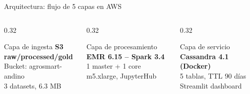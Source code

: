 \documentclass[14pt,aspectratio=169]{beamer}
\begin{document}
\begin{frame}{Arquitectura: flujo de 5 capas en AWS}
  \vspace{0.3em}
  \begin{columns}[T]
    \begin{column}{0.32\textwidth}
      \begin{block}{Capa de ingesta}
        \footnotesize
        \textbf{S3 raw/processed/gold}\\
        Bucket: agrosmart-andino\\
        3 datasets, 6.3 MB
      \end{block}
    \end{column}
    \begin{column}{0.32\textwidth}
      \begin{block}{Capa de procesamiento}
        \footnotesize
        \textbf{EMR 6.15 -- Spark 3.4}\\
        1 master + 1 core\\
        m5.xlarge, JupyterHub
      \end{block}
    \end{column}
    \begin{column}{0.32\textwidth}
      \begin{block}{Capa de servicio}
        \footnotesize
        \textbf{Cassandra 4.1 (Docker)}\\
        5 tablas, TTL 90 d\'ias\\
        Streamlit dashboard
      \end{block}
    \end{column}
  \end{columns}
\end{frame}
\end{document}
